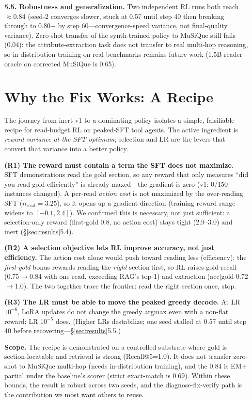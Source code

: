 \documentclass[10pt,twocolumn]{article}
\begin{document}
\textbf{5.5. Robustness and generalization.} Two independent RL runs both reach $\approx$0.84 (seed-2 converges slower, stuck at 0.57 until step 40 then breaking through to 0.80+ by step 60---convergence-speed variance, not final-quality variance). Zero-shot transfer of the synth-trained policy to MuSiQue still fails (0.04): the attribute-extraction task does not transfer to real multi-hop reasoning, so in-distribution training on real benchmarks remains future work (1.5B reader oracle on corrected MuSiQue is 0.65).

\section{Why the Fix Works: A Recipe}
\label{sec:analysis}
The journey from inert v1 to a dominating policy isolates a simple, falsifiable recipe for read-budget RL on peaked-SFT tool agents. The active ingredient is \emph{reward variance at the SFT optimum}; selection and LR are the levers that convert that variance into a better policy.

\textbf{(R1) The reward must contain a term the SFT does not maximize.} SFT demonstrations read the gold section, so any reward that only measures ``did you read gold efficiently'' is already maxed---the gradient is zero (v1: 0/150 instances changed). A per-read \emph{action cost} is not maximized by the over-reading SFT ($n_{\text{read}}{=}3.25$), so it opens up a gradient direction (training reward range widens to $[-0.1, 2.4]$). We confirmed this is necessary, not just sufficient: a selection-only reward (first-gold 0.8, no action cost) stays tight (2.9--3.0) and inert (\S\ref{sec:results}5.4).

\textbf{(R2) A selection objective lets RL improve accuracy, not just efficiency.} The action cost alone would push toward reading less (efficiency); the \emph{first-gold} bonus rewards reading the \emph{right} section first, so RL raises gold-recall (0.75$\to$0.84 with one read, exceeding RAG's top-1) and extraction (acc$|$gold 0.72$\to$1.0). The two together trace the frontier: read the right section once, stop.

\textbf{(R3) The LR must be able to move the peaked greedy decode.} At LR $10^{-6}$, LoRA updates do not change the greedy argmax even with a non-flat reward; LR $10^{-5}$ does. (Higher LRs destabilize; one seed stalled at 0.57 until step 40 before recovering---\S\ref{sec:results}5.5.)

\textbf{Scope.} The recipe is demonstrated on a controlled substrate where gold is section-locatable and retrieval is strong (Recall@5=1.0). It does not transfer zero-shot to MuSiQue multi-hop (needs in-distribution training), and the 0.84 is EM$+$partial under the baseline's scorer (strict exact-match is 0.69). Within these bounds, the result is robust across two seeds, and the diagnose-fix-verify path is the contribution we most want others to reuse.
\end{document}
